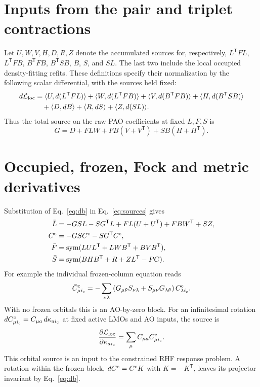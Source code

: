 \documentclass[11pt]{article}
\newcommand{\T}{^{\mathsf T}}
\newcommand{\sym}{\operatorname{sym}}
\newcommand{\ip}[2]{\langle #1,#2\rangle}
\begin{document}
\section{Inputs from the pair and triplet contractions}
Let $U,W,V,H,D,R,Z$ denote the accumulated sources for, respectively,
$L\T F L$, $L\T F B$, $B\T F B$, $B\T S B$, $B$, $S$, and $SL$.
The last two include the local occupied density-fitting refits.
These definitions specify their normalization by the following scalar
differential, with the sources held fixed:
\begin{align}
 d\mathcal L_{\rm loc}
 &=\ip U{d(L\T F L)}+\ip W{d(L\T F B)}
   +\ip V{d(B\T F B)}+\ip H{d(B\T S B)}\notag\\
 &\quad+\ip D{dB}+\ip R{dS}+\ip Z{d(SL)}.\label{eq:sources}
\end{align}
Thus the total source on the raw PAO coefficients at fixed $L,F,S$ is
\begin{equation}\label{eq:g}
 G=D+FLW+FB(V+V\T)+SB(H+H\T).
\end{equation}
\section{Occupied, frozen, Fock and metric derivatives}
Substitution of Eq.~\eqref{eq:db} in Eq.~\eqref{eq:sources} gives
\begin{align}
 \bar L&=-GSL-SG\T L+FL(U+U\T)+FBW\T+SZ,\label{eq:l}\\
 \bar C^{\rm c}&=-GSC^{\rm c}-SG\T C^{\rm c},\label{eq:c}\\
 \bar F&=\sym(LUL\T+LWB\T+BVB\T),\label{eq:f}\\
 \bar S&=\sym(BHB\T+R+ZL\T-PG).\label{eq:s}
\end{align}
For example the individual frozen-column equation reads
\begin{equation}\label{eq:coreindex}
 \bar C^{\rm c}_{\mu i_{\rm c}}
 =-\sum_{\nu\lambda}
 \left(G_{\mu\tilde\nu}S_{\nu\lambda}
 +S_{\mu\nu}G_{\lambda\tilde\nu}\right)
 C^{\rm c}_{\lambda i_{\rm c}}.
\end{equation}
With no frozen orbitals this is an AO-by-zero block. For an infinitesimal
rotation $dC^{\rm c}_{\mu i_{\rm c}}=C_{\mu a}\,d\kappa_{a i_{\rm c}}$
at fixed active LMOs and AO inputs, the source is
\begin{equation}\label{eq:kappa}
 \frac{\partial\mathcal L_{\rm loc}}{\partial\kappa_{a i_{\rm c}}}
 =\sum_\mu C_{\mu a}\bar C^{\rm c}_{\mu i_{\rm c}}.
\end{equation}
This orbital source is an input to the constrained RHF response problem.
A rotation within the frozen block, $dC^{\rm c}=C^{\rm c}K$ with $K=-K\T$,
leaves its projector invariant by Eq.~\eqref{eq:db}.
\end{document}
